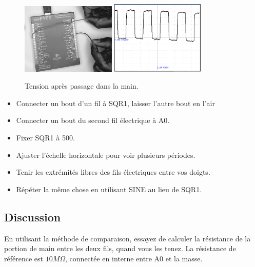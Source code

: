 \documentclass{book}
\begin{document}
\begin{figure}[h!]
\begin{center}
\caption{\label{}Tension après passage dans la main. }\vspace{0.5em}
\includegraphics[width=0.4\textwidth, height=0.3\textwidth, keepaspectratio]{Schematic-cond-main.png}
\includegraphics[width=0.4\textwidth, height=0.3\textwidth, keepaspectratio]{Pic-sqrwave-hand.png}
\end{center}
\end{figure}



\begin{itemize}
  \item Connecter un bout d'un fil à SQR1, laisser l'autre bout en l'air
  \item Connecter un bout du second fil électrique à A0.
  \item Fixer SQR1 à 500.
  \item Ajuster l'échelle horizontale pour voir plusieurs périodes.
  \item Tenir les extrémités libres des fils électriques entre vos doigts.
  \item Répéter la même chose en utilisant SINE au lieu de SQR1.
\end{itemize}




\subsection{Discussion}


En utilisant la méthode de comparaison, essayez de calculer la résistance de la portion de main entre les deux fils, quand vous les tenez. La résistance de référence est $10 M\Omega$, connectée en interne entre A0 et la masse.
\end{document}
